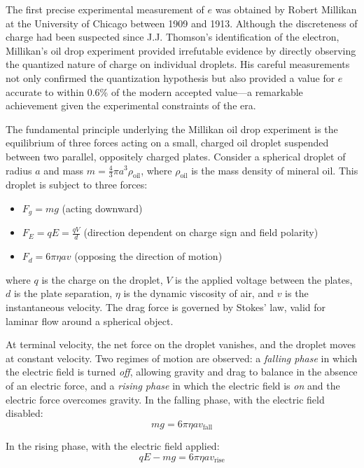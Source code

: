\documentclass[11pt]{article}
\begin{document}
The first precise experimental measurement of $e$ was obtained by Robert Millikan at the University of Chicago between 1909 and 1913. Although the discreteness of charge had been suspected since J.J. Thomson's identification of the electron, Millikan's oil drop experiment provided irrefutable evidence by directly observing the quantized nature of charge on individual droplets. His careful measurements not only confirmed the quantization hypothesis but also provided a value for $e$ accurate to within 0.6\% of the modern accepted value—a remarkable achievement given the experimental constraints of the era.

The fundamental principle underlying the Millikan oil drop experiment is the equilibrium of three forces acting on a small, charged oil droplet suspended between two parallel, oppositely charged plates. Consider a spherical droplet of radius $a$ and mass $m = \frac{4}{3}\pi a^3 \rho_{\text{oil}}$, where $\rho_{\text{oil}}$ is the mass density of mineral oil. This droplet is subject to three forces:

\begin{itemize}
    \item $F_g = mg$ (acting downward)
    \item $F_E = qE = \frac{qV}{d}$ (direction dependent on charge sign and field polarity)
    \item $F_d = 6\pi \eta a v$ (opposing the direction of motion)
\end{itemize}

where $q$ is the charge on the droplet, $V$ is the applied voltage between the plates, $d$ is the plate separation, $\eta$ is the dynamic viscosity of air, and $v$ is the instantaneous velocity. The drag force is governed by Stokes' law, valid for laminar flow around a spherical object.

At terminal velocity, the net force on the droplet vanishes, and the droplet moves at constant velocity. Two regimes of motion are observed: a \emph{falling phase} in which the electric field is turned \emph{off}, allowing gravity and drag to balance in the absence of an electric force, and a \emph{rising phase} in which the electric field is \emph{on} and the electric force overcomes gravity. In the falling phase, with the electric field disabled:
\begin{equation}
mg = 6\pi \eta a v_{\text{fall}}
\end{equation}

In the rising phase, with the electric field applied:
\begin{equation}
qE - mg = 6\pi \eta a v_{\text{rise}}
\end{equation}
\end{document}
